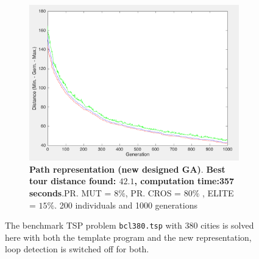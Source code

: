 \begin{figure}[!]
\begin{subfigure}{0.45\textwidth}
  \includegraphics[width=1\textwidth]{../figures/figures_question_4/path_vraag4_off_gen}
      \caption{\textbf{Path representation (new designed GA)}.  \textbf{Best tour distance found: $\mathbf{42.1}$, computation time:357 seconds}.PR. MUT = $8\%$, PR. CROS = $80\%$ , ELITE = $15\%$. 200 individuals and 1000 generations} 
      \label{fig:path_vraag4_off_gen}
\end{subfigure}
\caption{The benchmark TSP problem \texttt{bcl380.tsp} with 380 cities is solved here with both the template program and the new representation, loop detection is switched off for both.}
\label{fig:tour380_off}
\end{figure}
